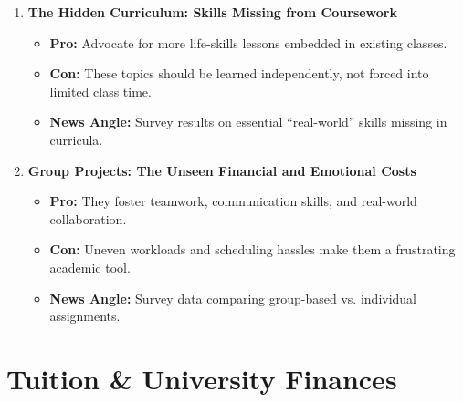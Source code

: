 \documentclass{article}
\begin{document}
\begin{enumerate}[leftmargin=*]
    \item \textbf{The Hidden Curriculum: Skills Missing from Coursework}
    \begin{itemize}
        \item \textbf{Pro:} Advocate for more life-skills lessons embedded in existing classes.
        \item \textbf{Con:} These topics should be learned independently, not forced into limited class time.
        \item \textbf{News Angle:} Survey results on essential ``real-world'' skills missing in curricula.
    \end{itemize}

    \item \textbf{Group Projects: The Unseen Financial and Emotional Costs}
    \begin{itemize}
        \item \textbf{Pro:} They foster teamwork, communication skills, and real-world collaboration.
        \item \textbf{Con:} Uneven workloads and scheduling hassles make them a frustrating academic tool.
        \item \textbf{News Angle:} Survey data comparing group-based vs. individual assignments.
    \end{itemize}
\end{enumerate}

\section*{Tuition \& University Finances}
\end{document}
